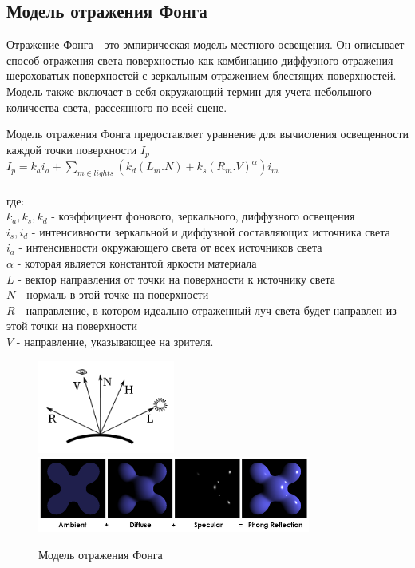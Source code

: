 \subsection*{Модель отражения Фонга}

Отражение Фонга - это эмпирическая модель местного освещения. Он описывает способ отражения света поверхностью как комбинацию диффузного отражения шероховатых поверхностей с зеркальным отражением блестящих поверхностей. Модель также включает в себя окружающий термин для учета небольшого количества света, рассеянного по всей сцене.

Модель отражения Фонга предоставляет уравнение для вычисления освещенности каждой точки поверхности $I_p$
\\

$
{\displaystyle I_p = k_ai_a + \sum_{m\in lights}(k_d(L_m.N) + k_s(R_m.V)^\alpha) i_{m}}
$\\\\
где:\\
$k_a, k_s, k_d$ - коэффициент фонового, зеркального, диффузного освещения\\
$i_s, i_d$ - интенсивности зеркальной и диффузной составляющих источника света\\
$i_a$ - интенсивности окружающего света от всех источников света\\
$\alpha$ - которая является константой яркости материала\\
$L$ - вектор направления от точки на поверхности к источнику света\\
$N$ - нормаль в этой точке на поверхности\\
$R$ - направление, в котором идеально отраженный луч света будет направлен из этой точки на поверхности\\
$V$ - направление, указывающее на зрителя.

\begin{figure}[ht]
  \centering
  \includegraphics[width=0.4\textwidth]{img/blinn_vectors.png}
  \includegraphics[width=0.8\textwidth]{img/phong_components.png}
  \caption{Модель отражения Фонга}
  \label{fig:1.5}
\end{figure}


